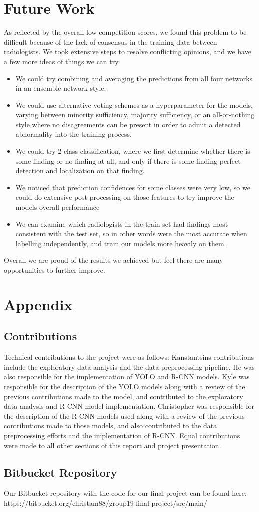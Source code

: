 \documentclass[conference]{IEEEtran}
\begin{document}
\section{Future Work} \label{future_work}
As reflected by the overall low competition scores, we found this problem to be difficult because of the lack of consensus in the training data between radiologists. We took extensive steps to resolve conflicting opinions, and we have a few more ideas of things we can try.
\begin{itemize}
    \item We could try combining and averaging the predictions from all four networks in an ensemble network style.
    \item We could use alternative voting schemes as a hyperparameter for the models, varying between minority sufficiency, majority sufficiency, or an all-or-nothing style where no disagreements can be present in order to admit a detected abnormality into the training process.
    \item We could try 2-class classification, where we first determine whether there is some finding or no finding at all, and only if there is some finding perfect detection and localization on that finding.
    \item We noticed that prediction confidences for some classes were very low, so we could do extensive post-processing on those features to try improve the models overall performance
    \item We can examine which radiologists in the train set had findings most consistent with the test set, so in other words were the most accurate when labelling independently, and train our models more heavily on them. 
\end{itemize}
Overall we are proud of the results we achieved but feel there are many opportunities to further improve.

\section{Appendix} \label{appendix}
\subsection{Contributions}
Technical contributions to the project were as follows: Kanstantsins contributions include the exploratory data analysis and the data preprocessing pipeline. He was also responsible for the implementation of YOLO and R-CNN models. Kyle was responsible for the description of the YOLO models along with a review of the previous contributions made to the model, and contributed to the exploratory data analysis and R-CNN model implementation. Christopher was responsible for the description of the R-CNN models used along with a review of the previous contributions made to those models, and also contributed to the data preprocessing efforts and the implementation of R-CNN. Equal contributions were made to all other sections of this report and project presentation.
\subsection{Bitbucket Repository}
Our Bitbucket repository with the code for our final project can be found here: https://bitbucket.org/christam88/group19-final-project/src/main/ 



\end{document}
